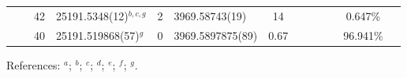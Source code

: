 \begin{table*}
\begin{center}
{\begin{tabular}{:l;l;c;l;c;l;c;l;l;c;c;c;c}
\rowstyle{\itshape}               &        & 42        & 25191.5348(12)$^{b,c,g}$         & 2 &    3969.58743(19)  &   14 & $                                        $ & $                                        $ &             &              & 0.647\%   & $     ^{}     $\\
\rowstyle{\itshape}               &        & 40        & 25191.519868(57)$^{g}$           & 0 &  3969.5897875(89)  & 0.67 & $                                        $ & $                                        $ &             &              & 96.941\%  & $     ^{}     $\\
\hline
\end{tabular}
}
{\footnotesize References:
$^{a}$\citet{Dzuba:2007:062510};
$^{b}$\citet{Maleki:1992:524};
$^{c}$\citet{Martensson-Pendrill:1992:4675};
$^{d}$\citet{Wolf:2009:223901};
$^{e}$\citet{Arbes:1994:27};
$^{f}$\citet{Nortershauser:1998:33};
$^{g}$\citet{Wolf:2008:032511}.}
\end{center}
\end{table*}
